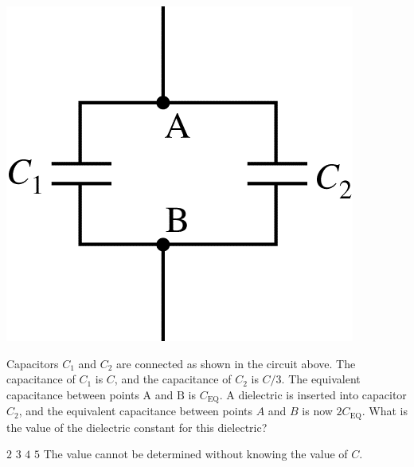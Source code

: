 \begin{center}
    \includegraphics[scale=0.3]{images/img-003-001.png}
\end{center}

\begin{questions}
\setcounter{question}{2}

\question
Capacitors $C_{1}$ and $C_{2}$ are connected as shown in the circuit above. The capacitance of $C_{1}$ is $C$, and the capacitance of $C_{2}$ is $C / 3$. The equivalent capacitance between points $\mathrm{A}$ and $\mathrm{B}$ is $C_{\mathrm{EQ}}$. A dielectric is inserted into capacitor $C_{2}$, and the equivalent capacitance between points $A$ and $B$ is now $2 C_{\mathrm{EQ}}$. What is the value of the dielectric constant for this dielectric?

\begin{choices}
    \choice $2$
    \choice $3$
    \choice $4$
    \choice $5$
    \choice The value cannot be determined without knowing the value of $C$.
\end{choices}

\end{questions}
